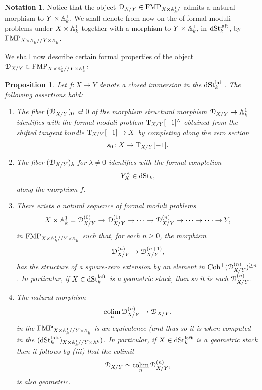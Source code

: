 \documentclass[10pt,a4paper,reqno]{amsart} %
\theoremstyle{plain}
\newtheorem{prop}[thm]{Proposition}
\theoremstyle{definition}
\newtheorem{notation}[thm]{Notation}
\theoremstyle{remark}
\numberwithin{equation}{section}
\begin{document}
\begin{notation}
    Notice that the object $\mathcal D_{X/ Y} \in \mathrm{FMP}_{X \times \mathbb A^1_k/ }$ admits a natural morphism to $Y \times \mathbb A^1_k$. We shall denote from now on the \infcat
    of formal moduli problems under $X \times \mathbb A^1_k$ together with a morphism to $Y \times \mathbb A^1_k$, in $\mathrm{dSt}_k^{\mathrm{laft}}$, by $\mathrm{FMP}_{X \times \mathbb A^1_k/ /Y \times \mathbb A^1_k}$.
\end{notation}
We shall now describe certain formal properties of the object $\mathcal D_{X/Y} \in \mathrm{FMP}_{X \times \mathbb A^1_k/ /Y \times \mathbb A^1_k}$:

\begin{prop} Let $f \colon X \to Y$ denote a closed immersion in the \infcat $\mathrm{dSt}_k^{\mathrm{laft}}$.
    The following assertions hold:
    \begin{enumerate}
        \item The fiber $(\mathcal D_{X/Y})_{0}$ at $0$ of the morphism structural morphism $\mathcal D_{X/Y} \to \mathbb A^1_k$ identifies with
        the formal moduli problem $\mathrm T_{X/Y}[-1]^\wedge$ obtained from the shifted tangent bundle $\mathrm T_{X/Y}[-1] \to X$ by completing along the
        zero section
            \[
                s_0 \colon X \to \mathrm T_{X/Y}[-1].  
            \]
        \item The fiber $(\mathcal D_{X/Y})_{\lambda}$ for $\lambda \neq 0$ identifies with the formal completion
            \[
                Y^\wedge_X \in \mathrm{dSt}_k,  
            \]
        along the morphism $f$.
        \item There exists a natural sequence of formal moduli problems
            \[
                X \times \mathbb A^1_k = \mathcal D_{X/Y}^{(0)} \to \mathcal D_{X/Y}^{(1)}  \to  \dots \to \mathcal D_{X/Y}^{(n)} \to \dots \to \dots \to Y,
            \]
        in $\mathrm{FMP}_{X\times\mathbb A^1_k/ /Y\times\mathbb A^1_k}$ such that, for each $n \ge 0$, the morphism
            \[
                \mathcal D^{(n)}_{X/Y} \to \mathcal D^{(n+1)}_{X/Y},  
            \]
        has the structure of a square-zero extension by an element in $\mathrm{Coh}^+(\mathcal D_{X/Y}^{(n)})^{\ge n}$. In particular, if $X \in \mathrm{dSt}_k^{\mathrm{laft}}$
        is a geometric stack, then so it is each $\mathcal D^{(n)}_{X/Y}$.
        \item The natural morphism
            \[\operatorname*{colim}_{n} \mathcal D^{(n)}_{X/Y} \to \mathcal D_{X/Y},\]
        in the \infcat $\mathrm{FMP}_{X \times \mathbb A^1_k/ /Y\times\mathbb A^1_k}$ is an equivalence
        (and thus so it is when computed in the \infcat $(\mathrm{dSt}_k^{\mathrm{laft}})_{X\times\mathbb A^1_k/ /Y\times\mathbb A^k})$. In particular, if $X \in \mathrm{dSt}_k^{\mathrm{laft}}$
        is a geometric stack then it follows by (iii) that the colimit 
            \[\mathcal D_{X/Y} \simeq \operatorname*{colim}_n \mathcal D_{X/Y}^{(n)},\]
        is also geometric.
    \end{enumerate}
\end{prop}
\end{document}
